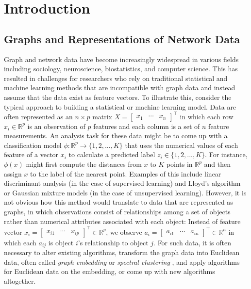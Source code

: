 \documentclass[
  11pt,
]{article}
\theoremstyle{definition}
\theoremstyle{definition}
\theoremstyle{definition}
\theoremstyle{definition}
\theoremstyle{remark}
\begin{document}
\newpage

\hypertarget{introduction}{%
\section{Introduction}\label{introduction}}

\hypertarget{graphs-and-representations-of-network-data}{%
\subsection{Graphs and Representations of Network Data}\label{graphs-and-representations-of-network-data}}

Graph and network data have become increasingly widespread in various fields including sociology, neuroscience, biostatistics, and computer science.
This has resulted in challenges for researchers who rely on traditional statistical and machine learning methods that are incompatible with graph data and instead assume that the data exist as feature vectors.
To illustrate this, consider the typical approach to building a statistical or machine learning model.
Data are often represented as an \(n \times p\) matrix \(X = \begin{bmatrix} x_1 & \cdots & x_n \end{bmatrix}^\top\) in which each row \(x_i \in \mathbb{R}^p\) is an observation of \(p\) features and each column is a set of \(n\) feature measurements.
An analysis task for these data might be to come up with a classification model \(\phi : \mathbb{R}^p \to \{1, 2, ..., K\}\) that uses the numerical values of each feature of a vector \(x_i\) to calculate a predicted label \(z_i \in \{1, 2, ..., K\}\).
For instance, \(\phi(x)\) might first compute the distances from \(x\) to \(K\) points in \(\mathbb{R}^p\) and then assign \(x\) to the label of the nearest point.
Examples of this include linear discriminant analysis (in the case of supervised learning) and Lloyd's algorithm \citep{1056489} or Gaussian mixture models \citep{doi:10.1198/016214502760047131} (in the case of unsupervised learning).
However, it is not obvious how this method would translate to data that are represented as graphs, in which observations consist of relationships among a set of objects rather than numerical attributes associated with each object:
Instead of feature vector \(x_i = \begin{bmatrix} x_{i1} & \cdots & x_{ip} \end{bmatrix}^\top \in \mathbb{R}^p\), we observe \(a_i = \begin{bmatrix} a_{i1} & \cdots & a_{in} \end{bmatrix}^\top \in \mathbb{R}^n\) in which each \(a_{ij}\) is object \(i\)'s relationship to object \(j\).
For such data, it is often necessary to alter existing algorithms, transform the graph data into Euclidean data, often called \emph{graph embedding} or \emph{spectral clustering} \citep{vonLuxburg2007}, and apply algorithms for Euclidean data on the embedding, or come up with new algorithms altogether.
\end{document}
